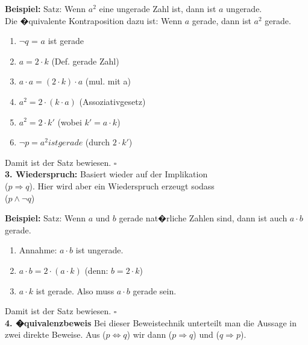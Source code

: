\textbf{Beispiel:}
Satz: \glqq Wenn $a^2$ eine ungerade Zahl ist, dann ist $a$ ungerade\grqq .\\
Die �quivalente Kontraposition dazu ist:
\glqq Wenn $a$ gerade, dann ist $a^2$ gerade\grqq.
\begin{enumerate}
  \item $\neg q$ = \glqq $a$ ist gerade\grqq
  \item $a = 2 \cdot k$ (Def. gerade Zahl)
  \item $a \cdot a = (2 \cdot k) \cdot a$ (mul. mit a)
  \item $a^2 = 2 \cdot (k \cdot a)$ (Assoziativgesetz)
  \item $a^2 = 2 \cdot k'$ (wobei $k' = a \cdot k$)
  \item $\neg p = a^2 ist gerade$ (durch $2 \cdot k'$)
\end{enumerate}
Damit ist der Satz bewiesen. $\square$
\\
\textbf{3. Wiederspruch:} Basiert wieder auf der Implikation \\($p \Rightarrow q$). Hier wird aber ein Wiederspruch erzeugt sodass \\($p \wedge \neg q$)

\textbf{Beispiel:}
Satz: \glqq Wenn $a$ und $b$ gerade nat�rliche Zahlen sind, dann ist auch $a \cdot b$ gerade\grqq .

\begin{enumerate}
  \item Annahme: $a \cdot b$ ist ungerade.
  \item $a \cdot b = 2 \cdot (a \cdot k)$ (denn: $b = 2 \cdot k$)
  \item $a \cdot k$ ist gerade. Also muss $a \cdot b$ gerade sein.
\end{enumerate}
Damit ist der Satz bewiesen. $\square$
\\
\textbf{4. �quivalenzbeweis} Bei dieser Beweistechnik unterteilt man die Aussage in zwei direkte Beweise. Aus ($p \Leftrightarrow q$) wir dann ($p \Rightarrow q$) und ($q \Rightarrow p$).

